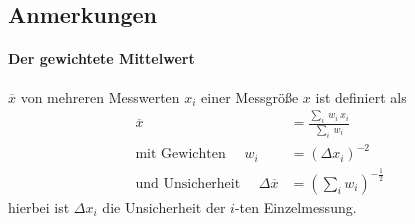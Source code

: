 \subsection{Anmerkungen}
%
\paragraph{Der gewichtete Mittelwert}
$\overline{x}$ von mehreren Messwerten $x_i$ einer Messgröße $x$ ist definiert als
\begin{subequations}\label{eq:weighted_mean}
    \begin{align}
    \overline{x} & = \frac{\sum\limits_{i}\ w_i \ x_{i}}{\sum\limits_{i} \ w_i }  \label{eq:wmean}\\
    \text{mit Gewichten } \quad w_i & = (\Delta x_{i})^{-2} \\
    \text{und Unsicherheit } \quad \Delta \overline{x} & = \left(  \sum\limits_{i} w_i  \right)^{-\frac{1}{2}} \label{eq:wmeanerr}
    \end{align}
\end{subequations}
hierbei ist $\Delta x_i$ die Unsicherheit der $i$-ten Einzelmessung.